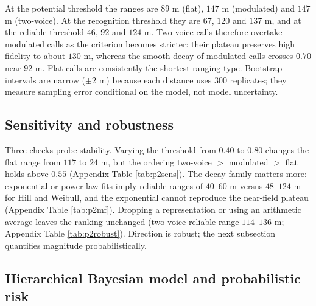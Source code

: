 \documentclass{apmcmthesis}
\begin{document}


At the potential threshold the ranges are $89$ m (flat), $147$ m (modulated) and $147$ m (two-voice). At the recognition threshold they are $67$, $120$ and $137$ m, and at the reliable threshold $46$, $92$ and $124$ m. Two-voice calls therefore overtake modulated calls as the criterion becomes stricter: their plateau preserves high fidelity to about $130$ m, whereas the smooth decay of modulated calls crosses $0.70$ near $92$ m. Flat calls are consistently the shortest-ranging type. Bootstrap intervals are narrow ($\pm2$ m) because each distance uses 300 replicates; they measure sampling error conditional on the model, not model uncertainty.

\subsection{Sensitivity and robustness}

Three checks probe stability. Varying the threshold from $0.40$ to $0.80$ changes the flat range from $117$ to $24$ m, but the ordering two-voice $>$ modulated $>$ flat holds above $0.55$ (Appendix Table \ref{tab:p2sens}). The decay family matters more: exponential or power-law fits imply reliable ranges of $40$--$60$ m versus $48$--$124$ m for Hill and Weibull, and the exponential cannot reproduce the near-field plateau (Appendix Table \ref{tab:p2mf}). Dropping a representation or using an arithmetic average leaves the ranking unchanged (two-voice reliable range $114$--$136$ m; Appendix Table \ref{tab:p2robust}). Direction is robust; the next subsection quantifies magnitude probabilistically.

\subsection{Hierarchical Bayesian model and probabilistic risk}
\end{document}

